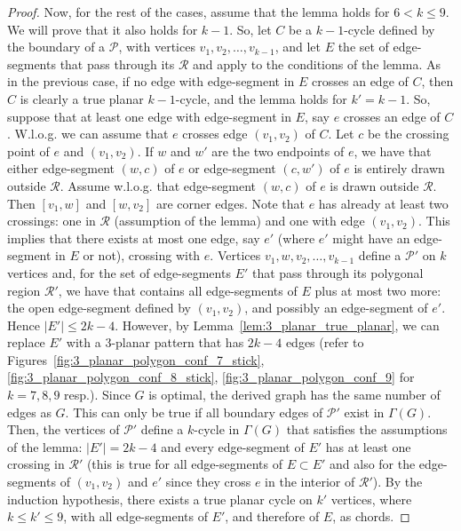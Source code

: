 \begin{proof}
Now, for the rest of the cases, assume that the lemma holds for $6<k\leq 9$. We will prove that it also holds for $k-1$. So, let $C$ be a $k-1$-cycle defined by the boundary of a \pp $\mathcal{P}$, with vertices $v_1,v_2,\dots,v_{k-1}$, and let $E$ the set of edge-segments that pass through its \pr $\mathcal{R}$ and apply to the conditions of the lemma. As in the previous case, if no edge with edge-segment in $E$ crosses an edge of $C$,  then $C$ is clearly a true planar $k-1$-cycle, and the lemma holds for $k'=k-1$. So, suppose that at least one edge with edge-segment in $E$, say $e$ crosses an edge of $C$. W.l.o.g. we can assume that $e$ crosses edge $(v_1,v_2)$ of $C$. Let $c$ be the crossing point of $e$ and $(v_1,v_2)$. If $w$ and $w'$ are the two endpoints of $e$, we have that either edge-segment $(w,c)$ of $e$ or edge-segment $(c,w')$ of $e$ is entirely drawn outside $\mathcal{R}$. Assume w.l.o.g. that edge-segment $(w,c)$ of $e$ is drawn outside $\mathcal{R}$. Then \pes $[v_1,w]$ and $[w,v_2]$ are corner edges. Note that $e$ has already at least two crossings: one in $\mathcal{R}$ (assumption of the lemma) and one with edge $(v_1,v_2)$. This implies that there exists at most one edge, say $e'$ (where $e'$ might have an edge-segment in $E$ or not), crossing with $e$. Vertices $v_1,w,v_2,\dots,v_{k-1}$ define a \pp $\mathcal{P}'$ on $k$ vertices and, for the set of edge-segments $E'$ that pass through its polygonal region $\mathcal{R}'$, we have that contains all edge-segments of $E$ plus at most two more: the open edge-segment defined by $(v_1,v_2)$, and possibly an edge-segment of $e'$. Hence $|E'|\leq 2k-4$. However, by Lemma~\ref{lem:3_planar_true_planar}, we can replace $E'$ with a $3$-planar pattern that has $2k-4$ edges (refer to Figures~\ref{fig:3_planar_polygon_conf_7_stick}, \ref{fig:3_planar_polygon_conf_8_stick}, \ref{fig:3_planar_polygon_conf_9} for $k=7,8,9$ resp.). Since $G$ is optimal, the derived graph has the same number of edges as $G$. This can only be true if all boundary edges of $\mathcal{P}'$ exist in $\Gamma(G)$. Then, the vertices of $\mathcal{P}'$ define a $k$-cycle in $\Gamma(G)$ that satisfies the assumptions of the lemma: $|E'|=2k-4$ and every edge-segment of $E'$ has at least one crossing in $\mathcal{R}'$ (this is true for all edge-segments of $E\subset E'$ and also for the edge-segments of $(v_1,v_2)$ and $e'$ since they cross $e$ in the interior of $\mathcal{R}'$). By the induction hypothesis, there exists a true planar cycle on $k'$ vertices, where $k\leq k'\leq 9$, with all edge-segments of $E'$, and therefore of $E$,  as chords.



\end{proof}
